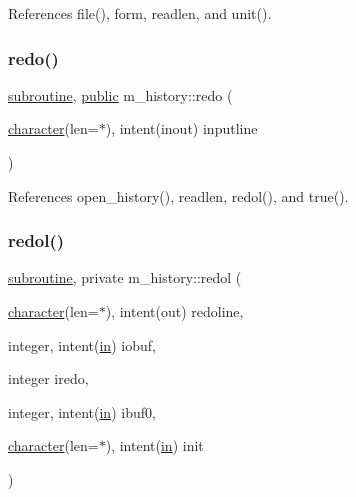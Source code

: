 References file(), form, readlen, and unit().

\mbox{\label{namespacem__history_a1abbc2c426b89526939d4389c9d3e391}} 
\subsubsection{\texorpdfstring{redo()}{redo()}}
{\footnotesize\ttfamily \hyperlink{M__stopwatch_83_8txt_acfbcff50169d691ff02d4a123ed70482}{subroutine}, \hyperlink{M__stopwatch_83_8txt_a2f74811300c361e53b430611a7d1769f}{public} m\+\_\+history\+::redo (\begin{DoxyParamCaption}\item[{\hyperlink{option__stopwatch_83_8txt_abd4b21fbbd175834027b5224bfe97e66}{character}(len=$\ast$), intent(inout)}]{inputline }\end{DoxyParamCaption})}



References open\+\_\+history(), readlen, redol(), and true().

\mbox{\label{namespacem__history_a155404b1f975ae6fe778f836c043eeb2}} 
\subsubsection{\texorpdfstring{redol()}{redol()}}
{\footnotesize\ttfamily \hyperlink{M__stopwatch_83_8txt_acfbcff50169d691ff02d4a123ed70482}{subroutine}, private m\+\_\+history\+::redol (\begin{DoxyParamCaption}\item[{\hyperlink{option__stopwatch_83_8txt_abd4b21fbbd175834027b5224bfe97e66}{character}(len=$\ast$), intent(out)}]{redoline,  }\item[{integer, intent(\hyperlink{M__journal_83_8txt_afce72651d1eed785a2132bee863b2f38}{in})}]{iobuf,  }\item[{integer}]{iredo,  }\item[{integer, intent(\hyperlink{M__journal_83_8txt_afce72651d1eed785a2132bee863b2f38}{in})}]{ibuf0,  }\item[{\hyperlink{option__stopwatch_83_8txt_abd4b21fbbd175834027b5224bfe97e66}{character}(len=$\ast$), intent(\hyperlink{M__journal_83_8txt_afce72651d1eed785a2132bee863b2f38}{in})}]{init }\end{DoxyParamCaption})\hspace{0.3cm}{\ttfamily [private]}}



